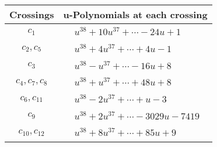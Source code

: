 \documentclass[1p]{elsarticle_modified}
\theoremstyle{definition}
\begin{document}
\begin{tabular}{m{50pt}|m{274pt}}
Crossings & \hspace{64pt}u-Polynomials at each crossing \\
\hline $$\begin{aligned}c_{1}\end{aligned}$$&$\begin{aligned}
&u^{38}+10 u^{37}+\cdots-24 u+1
\end{aligned}$\\
\hline $$\begin{aligned}c_{2},c_{5}\end{aligned}$$&$\begin{aligned}
&u^{38}+4 u^{37}+\cdots+4 u-1
\end{aligned}$\\
\hline $$\begin{aligned}c_{3}\end{aligned}$$&$\begin{aligned}
&u^{38}- u^{37}+\cdots-16 u+8
\end{aligned}$\\
\hline $$\begin{aligned}c_{4},c_{7},c_{8}\end{aligned}$$&$\begin{aligned}
&u^{38}+u^{37}+\cdots+48 u+8
\end{aligned}$\\
\hline $$\begin{aligned}c_{6},c_{11}\end{aligned}$$&$\begin{aligned}
&u^{38}-2 u^{37}+\cdots+u-3
\end{aligned}$\\
\hline $$\begin{aligned}c_{9}\end{aligned}$$&$\begin{aligned}
&u^{38}+2 u^{37}+\cdots-3029 u-7419
\end{aligned}$\\
\hline $$\begin{aligned}c_{10},c_{12}\end{aligned}$$&$\begin{aligned}
&u^{38}+8 u^{37}+\cdots+85 u+9
\end{aligned}$\\
\hline
\end{tabular}\\~\\
\newpage\renewcommand{\arraystretch}{1}
\end{document}
